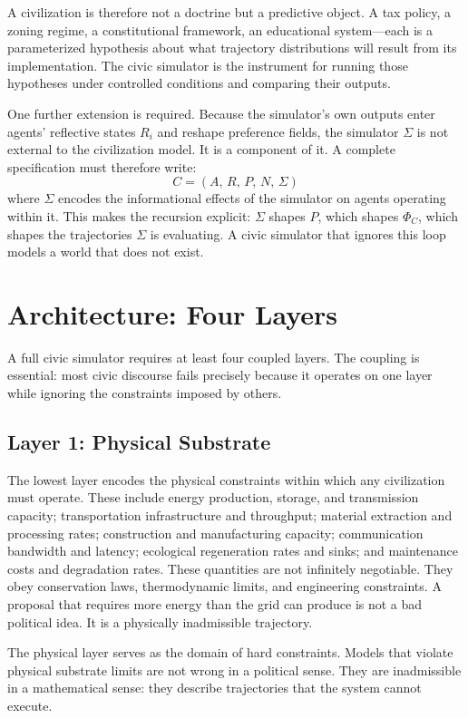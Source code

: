 \documentclass[12pt]{article}
\begin{document}
A civilization is therefore not a doctrine but a predictive object. A tax policy, a zoning regime, a constitutional framework, an educational system---each is a parameterized hypothesis about what trajectory distributions will result from its implementation. The civic simulator is the instrument for running those hypotheses under controlled conditions and comparing their outputs.

One further extension is required. Because the simulator's own outputs enter agents' reflective states $R_i$ and reshape preference fields, the simulator $\Sigma$ is not external to the civilization model. It is a component of it. A complete specification must therefore write:
\[
  C = (A,\, R,\, P,\, N,\, \Sigma)
\]
where $\Sigma$ encodes the informational effects of the simulator on agents operating within it. This makes the recursion explicit: $\Sigma$ shapes $P$, which shapes $\Phi_C$, which shapes the trajectories $\Sigma$ is evaluating. A civic simulator that ignores this loop models a world that does not exist.

\section{Architecture: Four Layers}

A full civic simulator requires at least four coupled layers. The coupling is essential: most civic discourse fails precisely because it operates on one layer while ignoring the constraints imposed by others.

\subsection{Layer 1: Physical Substrate}

The lowest layer encodes the physical constraints within which any civilization must operate. These include energy production, storage, and transmission capacity; transportation infrastructure and throughput; material extraction and processing rates; construction and manufacturing capacity; communication bandwidth and latency; ecological regeneration rates and sinks; and maintenance costs and degradation rates. These quantities are not infinitely negotiable. They obey conservation laws, thermodynamic limits, and engineering constraints. A proposal that requires more energy than the grid can produce is not a bad political idea. It is a physically inadmissible trajectory.

The physical layer serves as the domain of hard constraints. Models that violate physical substrate limits are not wrong in a political sense. They are inadmissible in a mathematical sense: they describe trajectories that the system cannot execute.
\end{document}
